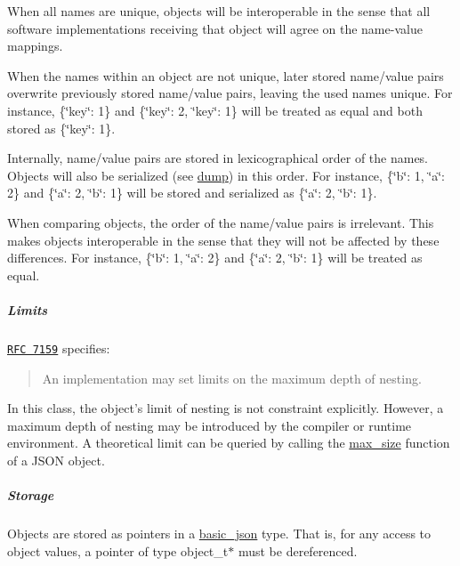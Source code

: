 \begin{DoxyItemize}
\item When all names are unique, objects will be interoperable in the sense that all software implementations receiving that object will agree on the name-\/value mappings.
\item When the names within an object are not unique, later stored name/value pairs overwrite previously stored name/value pairs, leaving the used names unique. For instance, {\ttfamily \{\char`\"{}key\char`\"{}\-: 1\}} and {\ttfamily \{\char`\"{}key\char`\"{}\-: 2, \char`\"{}key\char`\"{}\-: 1\}} will be treated as equal and both stored as {\ttfamily \{\char`\"{}key\char`\"{}\-: 1\}}.
\item Internally, name/value pairs are stored in lexicographical order of the names. Objects will also be serialized (see \hyperlink{classnlohmann_1_1basic__json_a805e3f3a2f374da0e14942eec7400e40}{dump}) in this order. For instance, {\ttfamily \{\char`\"{}b\char`\"{}\-: 1, \char`\"{}a\char`\"{}\-: 2\}} and {\ttfamily \{\char`\"{}a\char`\"{}\-: 2, \char`\"{}b\char`\"{}\-: 1\}} will be stored and serialized as {\ttfamily \{\char`\"{}a\char`\"{}\-: 2, \char`\"{}b\char`\"{}\-: 1\}}.
\item When comparing objects, the order of the name/value pairs is irrelevant. This makes objects interoperable in the sense that they will not be affected by these differences. For instance, {\ttfamily \{\char`\"{}b\char`\"{}\-: 1, \char`\"{}a\char`\"{}\-: 2\}} and {\ttfamily \{\char`\"{}a\char`\"{}\-: 2, \char`\"{}b\char`\"{}\-: 1\}} will be treated as equal.
\end{DoxyItemize}

\subparagraph*{Limits}

\href{http://rfc7159.net/rfc7159}{\tt R\-F\-C 7159} specifies\-: \begin{quotation}
An implementation may set limits on the maximum depth of nesting.

\end{quotation}


In this class, the object's limit of nesting is not constraint explicitly. However, a maximum depth of nesting may be introduced by the compiler or runtime environment. A theoretical limit can be queried by calling the \hyperlink{classnlohmann_1_1basic__json_a7936417b875b7ec737f77ef84bbf7871}{max\-\_\-size} function of a J\-S\-O\-N object.

\subparagraph*{Storage}

Objects are stored as pointers in a \hyperlink{classnlohmann_1_1basic__json}{basic\-\_\-json} type. That is, for any access to object values, a pointer of type {\ttfamily object\-\_\-t$\ast$} must be dereferenced.

